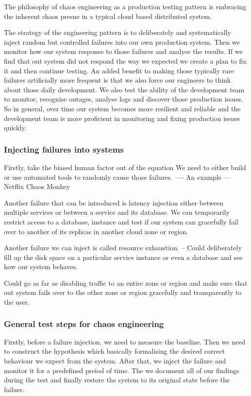 \documentclass[a4paper, 11pt]{book}
\begin{document}
{    The philosophy of chaos engineering as a production testing pattern is embracing the inherent chaos presne in a typical cloud based distributed system.

    The strategy of the engineering pattern is to deliberately and systematically inject random but controlled failures into our own production system.
    Then we monitor how our system response to those failures and analyse the results.
    If we find that out system did not respond the way we expected we create a plan to fix it and then continue testing.
    An added benefit to making those typically rare failures artificially more frequent is that we also force our engineers to think about those daily development.
    We also test the ability of the development team to monitor, recognise outages, analyse logs and discover those production issues.
    So in general, over time our system becomes more resilient and reliable and the development team is more proficient in monitoring and fixing production issues quickly.

    \subsubsection{Injecting failures into systems}
    Firstly, take the biased human factor out of the equation
    We need to either build or use automated tools to randomly cause those failures.
    ---- An example --- Netflix Chaos Monkey

    Another failure that can be introduced is latency injection either between multiple services or between a service and its database.
    We can temporarily restrict access to a database, instance and test if our system can gracefully fail over to another of its replicas in another cloud zone or region.

    Another failure we can inject is called resource exhaustion.
    -- Could deliberately fill up the disk space on a particular service instance or even a database and see how our system behaves.

    Could go as far as disabling traffic to an entire zone or region and make sure that out system fails over to the other zone or region gracefully and transparently to the user.

    \subsubsection{General test steps for chaos engineering}
    Firstly, before a failure injection, we need to measure the baseline.
    Then we need to construct the hypothesis which basically formalising the desired correct behaviour we expect from the system.
    After that, we inject the failure and monitor it for a predefined preiod of time.
    The we document all of our findings during the test and finally restore the system to its original state before the failure.

}
\end{document}
